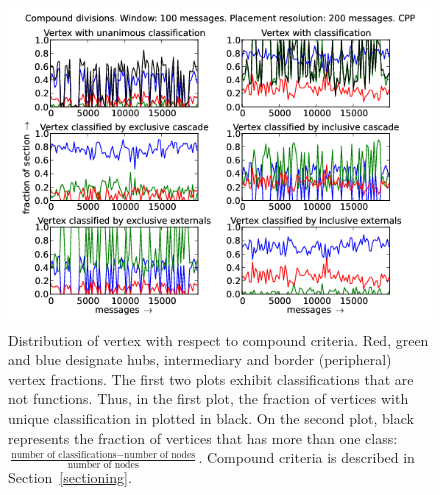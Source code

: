 \documentclass[%
 aip,
 jmp,%
 amsmath,amssymb,
 reprint,%
]{revtex4-1}
\begin{document}
\begin{figure}[hbtp] 
   \centering
        \includegraphics[width=\textwidth]{figs/CPP/100_2}
    \caption{Distribution of vertex with respect to compound criteria. Red, green and blue designate hubs, intermediary and border (peripheral) vertex fractions. The first two plots exhibit classifications that are not functions. Thus, in the first plot, the fraction of vertices with unique classification in plotted in black. On the second plot, black represents the fraction of vertices that has more than one class: $\frac{\text{number of classifications} - \text{number of nodes}}{\text{number of nodes}}$. Compound criteria is described in Section~\ref{sectioning}.}
    \label{fig:cpp100_}
\end{figure}
\end{document}
